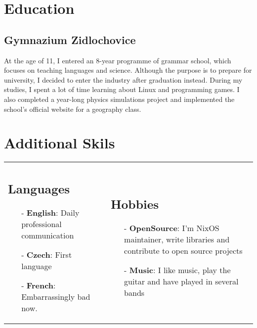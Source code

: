 \documentclass[9pt]{article}
\begin{document}
\section{Education}

\subsection{Gymnazium Zidlochovice}
At the age of 11, I entered an 8-year programme of grammar school,
which focuses on teaching languages and science. Although the purpose is to prepare for university,
I decided to enter the industry after graduation instead. During my studies,
I spent a lot of time learning about Linux and programming games.
I also completed a year-long physics simulations project and implemented the school’s official website for a geography class.

\vspace{0.3cm}
\section{Additional Skils}
\vspace{-0.3cm}

\begin{tabular}{@{}ll}
  \begin{minipage}[t]{0.5\textwidth}
      \subsection{Languages}
      \begin{itemize}[leftmargin=0.3cm]
        \item[-] \textbf{English}: Daily professional communication
        \item[-] \textbf{Czech}: First language
        \item[-] \textbf{French}: Embarrassingly bad now.
      \end{itemize}
  \end{minipage}
  & \begin{minipage}[t]{0.5\textwidth}
      \subsection{Hobbies}
      \begin{itemize}[leftmargin=0.3cm]
        \item[-] \textbf{OpenSource}: I'm NixOS maintainer, write libraries and contribute to open source projects
        \item[-] \textbf{Music}: I like music, play the guitar and have played in several bands
      \end{itemize}
  \end{minipage} \\
\end{tabular}
\end{document}
